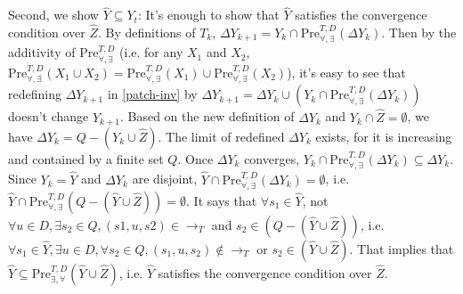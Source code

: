 Second, we show $ \widehat{Y}\subseteq Y_t $: It's enough to show that $ \widehat{Y} $ satisfies the convergence condition over $ \widehat{Z} $. By definitions of $ T_k $, $ \Delta Y_{k+1}= Y_k \cap \text{Pre}_{\forall,\exists}^{T, D}(\Delta Y_k)$. Then by the additivity of $ \text{Pre}^{T,D}_{\forall,\exists} $ (i.e. for any $ X_1 $ and $ X_2 $, $ \text{Pre}_{\forall,\exists}^{T,D} (X_1\cup X_2)=\text{Pre}_{\forall,\exists}^{T,D} (X_1)\cup \text{Pre}_{\forall,\exists}^{T,D} (X_2) $), it's easy to see that redefining $ \Delta Y_{k+1} $ in \eqref{patch-inv} by $ \Delta Y_{k+1} = \Delta Y_k \cup (Y_k \cap \text{Pre}_{\forall,\exists}^{T, D}(\Delta Y_k)) $ doesn't change $ Y_{k+1} $.  Based on the new definition of $ \Delta Y_k $ and $ Y_k \cap \widehat{Z} = \emptyset $, we have $ \Delta Y_k = Q-(Y_k\cup \widehat{Z}) $. The limit of redefined $ \Delta Y_k $ exists, for it is increasing and contained by a finite set $ Q $. Once $ \Delta Y_k $ converges, $ Y_k \cap \text{Pre}_{\forall,\exists}^{T, D}(\Delta Y_k)\subseteq \Delta Y_k $. Since $ Y_k=\widehat{Y} $ and $ \Delta Y_k $ are disjoint, $ \widehat{Y} \cap \text{Pre}_{\forall,\exists}^{T, D}(\Delta Y_k) = \emptyset $, i.e.  $ \widehat{Y} \cap \text{Pre}_{\forall,\exists}^{T, D}(Q-(\widehat{Y}\cup \widehat{Z})) = \emptyset $. It says that $ \forall s_1 \in \widehat{Y}$, not $\forall u\in D, \exists s_2\in Q, (s1,u,s2)\in \rightarrow_{T} $ and $s_2\in (Q-(\widehat{Y}\cup \widehat{Z}))$, i.e. $ \forall s_1 \in \widehat{Y}, \exists u\in D, \forall s_2 \in Q,  (s_1,u,s_2)\not\in \rightarrow_{T}$ or $ s_2\in (\widehat{Y}\cup \widehat{Z})$. That implies that $ \widehat{Y}\subseteq \text{Pre}_{\exists,\forall}^{T,D}(\widehat{Y}\cup \widehat{Z}) $, i.e. $ \widehat{Y} $ satisfies the convergence condition over $ \widehat{Z} $. \QEDB
